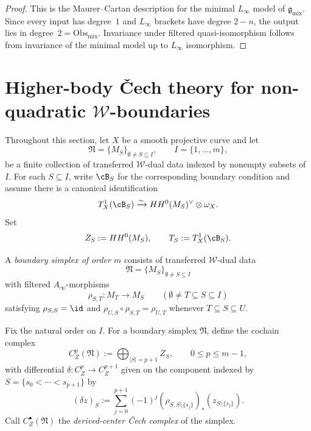 \begin{proof}
This is the Maurer--Cartan description for the minimal $L_\infty$ model of $\mathfrak g_{\mathrm{mix}}$. Since every input has degree~$1$ and $L_\infty$ brackets have degree $2-n$, the output lies in degree~$2 = \mathrm{Obs}_{\mathrm{mix}}$. Invariance under filtered quasi-isomorphism follows from invariance of the minimal model up to $L_\infty$ isomorphism.
\end{proof}


\section{Higher-body \v{C}ech theory for non-quadratic $\mathcal W$-boundaries}
\label{sec:w-boundary-cech-theory}

\begin{convention}
\label{conv:derived-tangent-center-input}
Throughout this section, let $X$ be a smooth projective curve and let
\[
\mathfrak N=\{M_S\}_{\emptyset\neq S\subseteq I},\qquad I=\{1,\dots,m\},
\]
be a finite collection of transferred $\mathcal W$-dual data indexed by nonempty subsets of $I$.
For each $S\subseteq I$, write $\cB_S$ for the corresponding boundary condition and assume there is a canonical identification
\[
T^1_X(\cB_S)
\xrightarrow{\sim}
HH^0(M_S)^\vee\otimes \omega_X.
\]
Set
\[
Z_S:=HH^0(M_S),\qquad T_S:=T^1_X(\cB_S).
\]
\end{convention}

\begin{definition}
\label{def:w-boundary-simplex}
A \emph{boundary simplex of order $m$} consists of transferred $\mathcal W$-dual data
\[
\mathfrak N=\{M_S\}_{\emptyset\neq S\subseteq I}
\]
with filtered $A_\infty$-morphisms
\[
\rho_{S,T}\colon M_T\longrightarrow M_S
\qquad (\emptyset\neq T\subseteq S\subseteq I)
\]
satisfying $\rho_{S,S}=\id$ and $\rho_{U,S}\circ \rho_{S,T}=\rho_{U,T}$ whenever
$T\subseteq S\subseteq U$.
\end{definition}

\begin{definition}
\label{def:w-derived-center-cech}
Fix the natural order on $I$. For a boundary simplex $\mathfrak N$, define the cochain complex
\[
C_Z^p(\mathfrak N):=\bigoplus_{|S|=p+1} Z_S,
\qquad 0\le p\le m-1,
\]
with differential $\delta\colon C_Z^p\to C_Z^{p+1}$ given on the component indexed by
$S=\{s_0<\cdots<s_{p+1}\}$ by
\[
(\delta z)_S
:=
\sum_{j=0}^{p+1}(-1)^j (\rho_{S,S\setminus\{s_j\}})_*(z_{S\setminus\{s_j\}}).
\]
Call $C_Z^\bullet(\mathfrak N)$ the \emph{derived-center \v{C}ech complex} of the simplex.
\end{definition}

